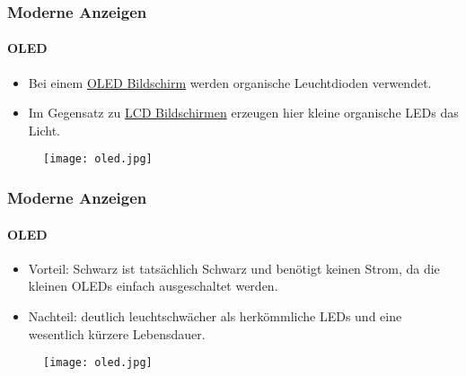 \begin{frame}
    \frametitle{Moderne Anzeigen}
    \framesubtitle{OLED}
    \begin{minipage}{0.5\textwidth}
        \begin{itemize}
            \item Bei einem \href{https://de.wikipedia.org/wiki/Organische_Leuchtdiode}{OLED Bildschirm} werden organische Leuchtdioden verwendet.
            \item Im Gegensatz zu \href{https://de.wikipedia.org/wiki/Fl\%C3\%BCssigkristallanzeige}{LCD Bildschirmen} erzeugen hier kleine organische LEDs das Licht.
        \end{itemize}
    \end{minipage} \hfill
    \begin{minipage}{0.45\textwidth}
        \begin{figure}
            \texttt{[image: oled.jpg]}
        \end{figure}
    \end{minipage}
\end{frame}

\begin{frame}
    \frametitle{Moderne Anzeigen}
    \framesubtitle{OLED}
    \begin{minipage}{0.5\textwidth}
        \begin{itemize}
            \item Vorteil: Schwarz ist tatsächlich Schwarz und benötigt keinen Strom, da die kleinen OLEDs einfach ausgeschaltet werden.
            \item Nachteil: deutlich leuchtschwächer als herkömmliche LEDs und eine wesentlich kürzere Lebensdauer.
        \end{itemize}
    \end{minipage} \hfill
    \begin{minipage}{0.45\textwidth}
        \begin{figure}
            \texttt{[image: oled.jpg]}
        \end{figure}
    \end{minipage}
\end{frame}

